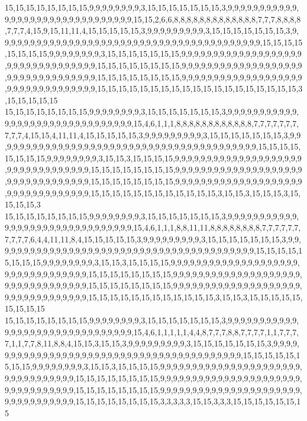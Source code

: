 15,15,15,15,15,15,15,15,9,9,9,9,9,9,9,9,3,15,15,15,15,15,15,15,3,9,9,9,9,9,9,9,9,9,9,9,9,9,9,9,9,9,9,9,9,9,9,9,9,9,9,9,9,9,9,9,15,15,2,6,6,8,8,8,8,8,8,8,8,8,8,8,8,8,7,7,7,8,8,8,8,7,7,7,4,15,9,15,11,11,4,15,15,15,15,15,3,9,9,9,9,9,9,9,9,9,3,15,15,15,15,15,15,15,3,9,9,9,9,9,9,9,9,9,9,9,9,9,9,9,9,9,9,9,9,9,9,9,9,9,9,9,9,9,9,9,9,9,9,9,9,9,9,9,9,9,15,15,15,15,15,15,15,15,9,9,9,9,9,9,9,9,3,15,15,15,15,15,15,15,9,9,9,9,9,9,9,9,9,9,9,9,9,9,9,9,9,9,9,9,9,9,9,9,9,9,9,9,9,9,9,9,9,15,15,15,15,15,15,15,15,9,9,9,9,9,9,9,9,9,9,9,9,9,9,9,9,9,9,9,9,9,9,9,9,9,9,9,9,9,9,9,9,9,15,15,15,15,15,15,15,15,9,9,9,9,9,9,9,9,9,9,9,9,9,9,9,9,9,9,9,9,9,9,9,9,9,9,9,9,9,9,9,9,9,15,15,15,15,15,15,15,15,15,15,15,15,15,15,15,15,15,15,15,3,15,15,15,15,15
15,15,15,15,15,15,15,15,9,9,9,9,9,9,9,9,3,15,15,15,15,15,15,15,3,9,9,9,9,9,9,9,9,9,9,9,9,9,9,9,9,9,9,9,9,9,9,9,9,9,9,9,9,9,9,9,15,4,6,1,1,1,8,8,8,8,8,8,8,8,8,8,8,8,7,7,7,7,7,7,7,7,7,7,4,15,15,4,11,11,4,15,15,15,15,15,3,9,9,9,9,9,9,9,9,9,3,15,15,15,15,15,15,15,3,9,9,9,9,9,9,9,9,9,9,9,9,9,9,9,9,9,9,9,9,9,9,9,9,9,9,9,9,9,9,9,9,9,9,9,9,9,9,9,9,9,15,15,15,15,15,15,15,15,9,9,9,9,9,9,9,9,3,15,15,3,15,15,15,15,9,9,9,9,9,9,9,9,9,9,9,9,9,9,9,9,9,9,9,9,9,9,9,9,9,9,9,9,9,9,9,9,9,15,15,15,15,15,15,15,15,9,9,9,9,9,9,9,9,9,9,9,9,9,9,9,9,9,9,9,9,9,9,9,9,9,9,9,9,9,9,9,9,9,15,15,15,15,15,15,15,15,9,9,9,9,9,9,9,9,9,9,9,9,9,9,9,9,9,9,9,9,9,9,9,9,9,9,9,9,9,9,9,9,9,15,15,15,15,15,15,15,15,15,15,15,15,3,15,15,3,15,15,15,3,15,15,15,15,3
15,15,15,15,15,15,15,15,9,9,9,9,9,9,9,9,3,15,15,15,15,15,15,15,3,9,9,9,9,9,9,9,9,9,9,9,9,9,9,9,9,9,9,9,9,9,9,9,9,9,9,9,9,9,9,9,15,4,6,1,1,1,8,8,11,11,8,8,8,8,8,8,8,8,7,7,7,7,7,7,7,7,7,7,6,4,4,11,11,8,4,15,15,15,15,15,3,9,9,9,9,9,9,9,9,9,3,15,15,15,15,15,15,15,3,9,9,9,9,9,9,9,9,9,9,9,9,9,9,9,9,9,9,9,9,9,9,9,9,9,9,9,9,9,9,9,9,9,9,9,9,9,9,9,9,9,15,15,15,15,15,15,15,15,9,9,9,9,9,9,9,9,3,15,15,3,15,15,15,15,9,9,9,9,9,9,9,9,9,9,9,9,9,9,9,9,9,9,9,9,9,9,9,9,9,9,9,9,9,9,9,9,9,15,15,15,15,15,15,15,15,9,9,9,9,9,9,9,9,9,9,9,9,9,9,9,9,9,9,9,9,9,9,9,9,9,9,9,9,9,9,9,9,9,15,15,15,15,15,15,15,15,9,9,9,9,9,9,9,9,9,9,9,9,9,9,9,9,9,9,9,9,9,9,9,9,9,9,9,9,9,9,9,9,9,15,15,15,15,15,15,15,15,15,15,15,15,3,15,15,3,15,15,15,15,15,15,15,15,15
15,15,15,15,15,15,15,15,9,9,9,9,9,9,9,9,3,15,15,15,15,15,15,15,3,9,9,9,9,9,9,9,9,9,9,9,9,9,9,9,9,9,9,9,9,9,9,9,9,9,9,9,9,9,9,9,15,4,6,1,1,1,1,1,4,4,8,7,7,7,8,8,7,7,7,7,1,1,7,7,7,7,1,1,7,7,8,11,8,8,4,15,15,3,15,15,3,9,9,9,9,9,9,9,9,9,3,15,15,15,15,15,15,15,3,9,9,9,9,9,9,9,9,9,9,9,9,9,9,9,9,9,9,9,9,9,9,9,9,9,9,9,9,9,9,9,9,9,9,9,9,9,9,9,9,9,15,15,15,15,15,15,15,15,9,9,9,9,9,9,9,9,3,15,15,3,15,15,15,15,9,9,9,9,9,9,9,9,9,9,9,9,9,9,9,9,9,9,9,9,9,9,9,9,9,9,9,9,9,9,9,9,9,15,15,15,15,15,15,15,15,9,9,9,9,9,9,9,9,9,9,9,9,9,9,9,9,9,9,9,9,9,9,9,9,9,9,9,9,9,9,9,9,9,15,15,15,15,15,15,15,15,9,9,9,9,9,9,9,9,9,9,9,9,9,9,9,9,9,9,9,9,9,9,9,9,9,9,9,9,9,9,9,9,9,15,15,15,15,15,15,15,15,3,3,3,3,3,15,15,3,3,3,15,15,15,15,15,15,15
